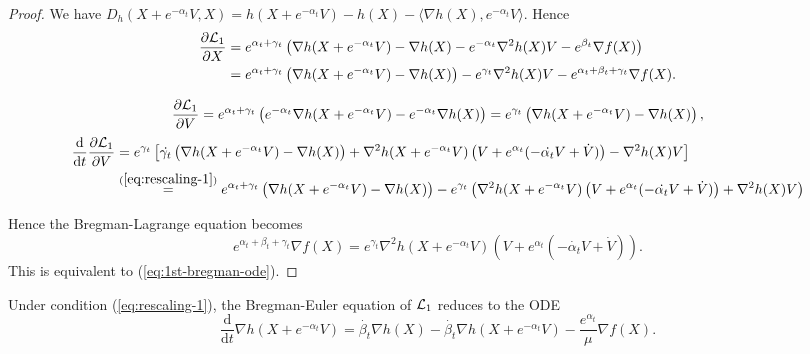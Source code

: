 \begin{proof}
    We have $D_h(X+e^{-\alpha_t}V, X) = h(X+e^{-\alpha_t}V) - h(X) - \langle \nabla h(X), e^{-\alpha_t} V  \rangle$. Hence
    \begin{align*}
        \dfrac{\partial \mathcal{L}_1}{\partial X}
         & = e^{\alpha_t +\gamma_t}\left(\nabla h(X+e^{-\alpha_t}V) - \nabla h(X) - e^{-\alpha_t}\nabla^2 h(X) V - e^{\beta_t}\nabla f(X)\right)                    \\
         & = e^{\alpha_t +\gamma_t}\left(\nabla h(X+e^{-\alpha_t}V) - \nabla h(X)\right) - e^{\gamma_t} \nabla^2 h(X) V - e^{\alpha_t+\beta_t+\gamma_t}\nabla f(X).
    \end{align*}

    $$\dfrac{\partial \mathcal{L}_1}{\partial V} = e^{\alpha_t+\gamma_t}\left(e^{-\alpha_t}\nabla h(X+e^{-\alpha_t}V) - e^{-\alpha_t}\nabla h(X) \right) = e^{\gamma_t}\left(\nabla h(X+e^{-\alpha_t}V) - \nabla h(X) \right),$$
    \begin{align*}
        \dfrac{\mathrm{d}}{\mathrm{d}t}\dfrac{\partial \mathcal{L}_1}{\partial V}
         & = e^{\gamma_t}\left[\dot{\gamma_t}\left(\nabla h(X+e^{-\alpha_t}V) - \nabla h(X) \right)+\nabla^2  h(X+e^{-\alpha_t}V)\left(V+e^{\alpha_t}(-\dot{\alpha_t}V + \dot{V})\right) - \nabla^2 h(X)V\right]                                              \\
         & \stackrel{(\ref{eq:rescaling-1})}{=} e^{\alpha_t +\gamma_t}\left(\nabla h(X+e^{-\alpha_t}V) - \nabla h(X)\right) - e^{\gamma_t}\left( \nabla^2  h(X+e^{-\alpha_t}V)\left(V+e^{\alpha_t}(-\dot{\alpha_t}V + \dot{V})\right) + \nabla^2 h(X)V\right)
    \end{align*}

    Hence the Bregman-Lagrange equation becomes
    $$e^{\alpha_t+\beta_t+\gamma_t}\nabla f(X) = e^{\gamma_t}\nabla^2  h(X+e^{-\alpha_t}V)\left(V+e^{\alpha_t}(-\dot{\alpha_t}V + \dot{V})\right).$$
    This is equivalent to (\ref{eq:1st-bregman-ode}).
\end{proof}

\begin{proposition}
    Under condition (\ref{eq:rescaling-1}), the Bregman-Euler equation of $\mathcal{L}_1$ reduces to the ODE
    \begin{equation}
        \label{eq:2nd-bregman-ode}
        \dfrac{\mathrm{d}}{\mathrm{d}t}\nabla h(X + e^{-\alpha_t}V) = \dot{\beta_t}\nabla h(X) - \dot{\beta_t}\nabla h(X + e^{-\alpha_t}V) -\dfrac{e^{\alpha_t}}{\mu}\nabla f(X).
    \end{equation}
    \label{prop:2nd-bregman-ode}
\end{proposition}


